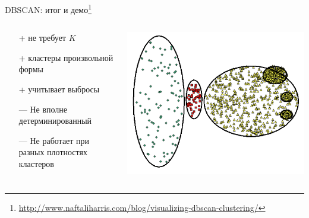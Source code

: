 \documentclass[aspectratio=169]{beamer}
\begin{document}
\begin{frame}{DBSCAN: итог и демо\footnote{\url{http://www.naftaliharris.com/blog/visualizing-dbscan-clustering/}}}

\begin{columns}[]
    \begin{column}{.6\textwidth} 
    \begin{itemize}
	\item[+] не требует $K$
	\item[+] кластеры произвольной формы
	\item[+] учитывает выбросы
	\item[---] Не вполне детерминированный
	\item[---] Не работает при разных плотностях кластеров
	\end{itemize}		    
    \end{column}
    \begin{column}{.4\textwidth}
    \vspace{1em}
    \includegraphics[scale=0.25]{images/dbprob.png}    
    \end{column}
\end{columns}

\end{frame}
\end{document}
